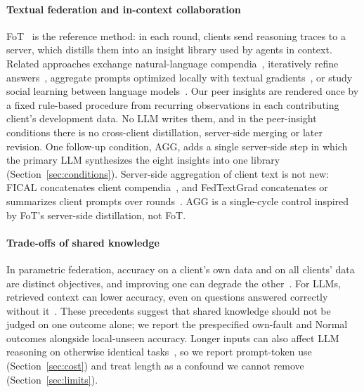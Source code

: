 \documentclass[conference]{IEEEtran}
\newcommand{\cond}[1]{\textsf{#1}}
\begin{document}
\paragraph{Textual federation and in-context collaboration}
FoT~\cite{yao2026fot} is the reference method: in each round, clients send reasoning traces to a server, which distills them into an insight library used by agents in context. Related approaches exchange natural-language compendia~\cite{wu2024fical}, iteratively refine answers~\cite{wang2025fedicl}, aggregate prompts optimized locally with textual gradients~\cite{chen2025fedtextgrad}, or study social learning between language models~\cite{mohtashami2023social}. Our peer insights are rendered once by a fixed rule-based procedure from recurring observations in each contributing client's development data. No LLM writes them, and in the peer-insight conditions there is no cross-client distillation, server-side merging or later revision. One follow-up condition, \cond{AGG}, adds a single server-side step in which the primary LLM synthesizes the eight insights into one library (Section~\ref{sec:conditions}). Server-side aggregation of client text is not new: FICAL concatenates client compendia~\cite{wu2024fical}, and FedTextGrad concatenates or summarizes client prompts over rounds~\cite{chen2025fedtextgrad}. \cond{AGG} is a single-cycle control inspired by FoT's server-side distillation, not FoT.

\paragraph{Trade-offs of shared knowledge}
In parametric federation, accuracy on a client's own data and on all clients' data are distinct objectives, and improving one can degrade the other~\cite{chen2022fedrod}. For LLMs, retrieved context can lower accuracy, even on questions answered correctly without it~\cite{mallen2023trust,yoran2024robust}. These precedents suggest that shared knowledge should not be judged on one outcome alone; we report the prespecified own-fault and Normal outcomes alongside local-unseen accuracy. Longer inputs can also affect LLM reasoning on otherwise identical tasks~\cite{levy2024same}, so we report prompt-token use (Section~\ref{sec:cost}) and treat length as a confound we cannot remove (Section~\ref{sec:limits}).
\end{document}
